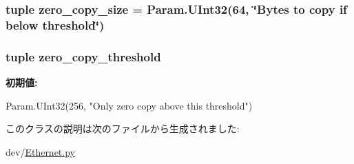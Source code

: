 \label{classEthernet_1_1Sinic_ad152ba2857f68b25cd512c0f19295d92}
\hypertarget{classEthernet_1_1Sinic_a6ea4482b3ba329599bd228765ef1b94a}{
\subsubsection[{zero\_\-copy\_\-size}]{\setlength{\rightskip}{0pt plus 5cm}tuple {\bf zero\_\-copy\_\-size} = Param.UInt32(64, \char`\"{}Bytes to copy if below threshold\char`\"{})}}
\label{classEthernet_1_1Sinic_a6ea4482b3ba329599bd228765ef1b94a}
\hypertarget{classEthernet_1_1Sinic_a8203956e7fb7375ad748c7749fd79643}{
\subsubsection[{zero\_\-copy\_\-threshold}]{\setlength{\rightskip}{0pt plus 5cm}tuple {\bf zero\_\-copy\_\-threshold}}}
\label{classEthernet_1_1Sinic_a8203956e7fb7375ad748c7749fd79643}
{\bfseries 初期値:}
\begin{DoxyCode}
Param.UInt32(256,
        "Only zero copy above this threshold")
\end{DoxyCode}


このクラスの説明は次のファイルから生成されました:\begin{DoxyCompactItemize}
\item 
dev/\hyperlink{Ethernet_8py}{Ethernet.py}\end{DoxyCompactItemize}
